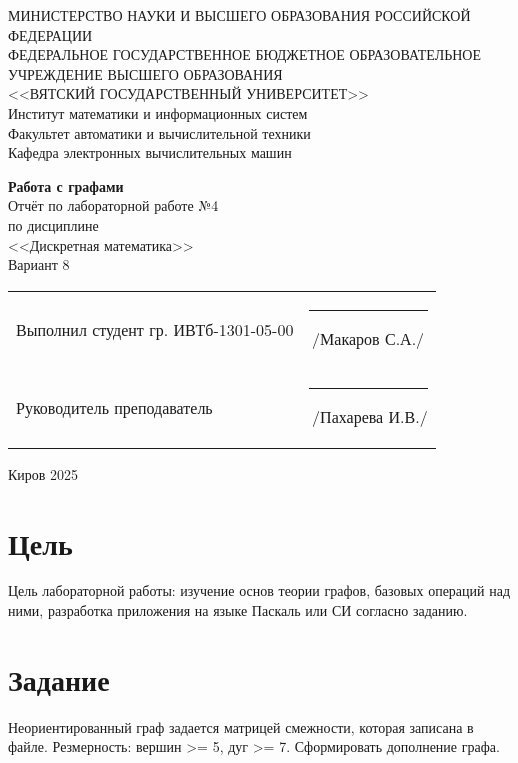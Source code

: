 \documentclass[a4paper,14pt]{extarticle}
\begin{document}
  \newpage\thispagestyle{empty}
  \begin{center}
    \MakeUppercase{
      Министерство науки и высшего образования Российской Федерации\\
      Федеральное государственное бюджетное образовательное учреждение высшего образования\\
      <<Вятский Государственный Университет>>\\
    }
    Институт математики и информационных систем\\
    Факультет автоматики и вычислительной техники\\
    Кафедра электронных вычислительных машин
  \end{center}
  \vfill

  \begin{center}
    \textbf{Работа с графами}\\
    Отчёт по лабораторной работе №4\\
    по дисциплине\\
    <<Дискретная математика>>\\
    Вариант 8
  \end{center}
  \vfill

  \noindent
  \begin{tabular}{ll}
    Выполнил студент гр. ИВТб-1301-05-00 \hspace{5mm} &
    \rule[-1mm]{25mm}{0.10mm}\,/Макаров С.А./\\
    
    Руководитель преподаватель & \rule[-1mm]{25mm}{0.10mm}\,/Пахарева И.В./\\
  \end{tabular}

  \vfill
  \begin{center}
    Киров 2025
  \end{center}

  \newpage
  \section*{Цель}
  Цель лабораторной работы: изучение основ теории графов, базовых операций над ними, разработка приложения на языке Паскаль или СИ согласно заданию.

  \section*{Задание}
  Неориентированный граф задается матрицей смежности, которая записана в файле. Резмерность: вершин >= 5, дуг >= 7. Сформировать дополнение графа.
\end{document}
